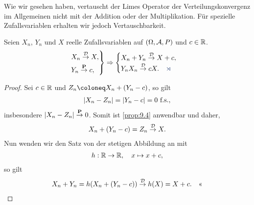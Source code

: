 Wie wir gesehen haben, vertauscht der Limes Operator der
Verteilungskonvergenz im Allgemeinen nicht mit der Addition oder der
Multiplikation. Für spezielle Zufallsvariablen erhalten wir jedoch
Vertauschbarkeit.

\begin{prop}
\label{prop:9.7}
Seien $X_{n}$, $Y_{n}$ und $X$ reelle Zufallsvariablen auf
$(\Omega, \AA, P)$ und $c\in \R$.
\begin{align*}
\begin{rcases}
X_{n}\Dto X,\\
Y_{n} \Pto c,
\end{rcases}
\Rightarrow
\begin{cases}
X_{n} +Y_{n} \Dto X+c,\\
Y_{n}X_{n} \Dto cX.\fishhere
\end{cases}
\end{align*}
\end{prop}
\begin{proof}
Sei $c\in\R$ und $Z_n\defl X_n+(Y_n-c)$, so gilt
\begin{align*}
\abs{X_n-Z_n} = \abs{Y_n-c} = 0 \fs,
\end{align*}
insbesondere  $\abs{X_n-Z_n}\Pto 0$. Somit ist \ref{prop:9.4} anwendbar und
daher,
\begin{align*}
X_n+(Y_n-c) = Z_n\Dto X.
\end{align*}
Nun wenden wir den Satz von der stetigen Abbildung an mit
\begin{align*}
h : \R\to\R,\quad x\mapsto x+c,
\end{align*}
so gilt
\begin{align*}
X_n + Y_n = h(X_n+(Y_n-c)) \Dto h(X) = X+c.\qedhere
\end{align*}
\end{proof}

